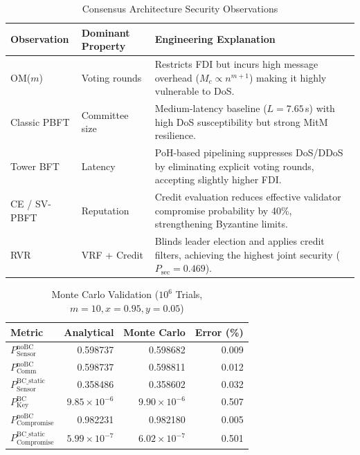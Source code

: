\documentclass[10pt,twocolumn,journal]{IEEEtran}
\begin{document}
\begin{table}[t]
\caption{Consensus Architecture Security Observations}
\label{tab:engineering_insights}
\centering
\scriptsize
\begin{tabular}{@{}llp{4.5cm}@{}}
\toprule
\textbf{Observation} & \textbf{Dominant Property} & \textbf{Engineering Explanation} \\
\midrule
OM($m$) & Voting rounds & Restricts FDI but incurs high message overhead ($M_c \propto n^{m+1}$) making it highly vulnerable to DoS. \\
Classic PBFT & Committee size & Medium-latency baseline ($L=7.65$\,s) with high DoS susceptibility but strong MitM resilience. \\
Tower BFT & Latency & PoH-based pipelining suppresses DoS/DDoS by eliminating explicit voting rounds, accepting slightly higher FDI. \\
CE / SV-PBFT & Reputation & Credit evaluation reduces effective validator compromise probability by 40\%, strengthening Byzantine limits. \\
RVR & VRF + Credit & Blinds leader election and applies credit filters, achieving the highest joint security ($P_{\mathrm{sec}} = 0.469$). \\
\bottomrule
\end{tabular}
\end{table}

\begin{table}[t]
\caption{Monte Carlo Validation ($10^6$ Trials, $m=10, x=0.95, y=0.05$)}
\label{tab:mc_validation}
\centering
\scriptsize
\begin{tabular}{@{}lrrr@{}}
\toprule
\textbf{Metric} & \textbf{Analytical} & \textbf{Monte Carlo} & \textbf{Error (\%)} \\
\midrule
$P_{\mathrm{Sensor}}^{\mathrm{noBC}}$ & 0.598737 & 0.598682 & 0.009 \\
$P_{\mathrm{Comm}}^{\mathrm{noBC}}$ & 0.598737 & 0.598811 & 0.012 \\
$P_{\mathrm{Sensor}}^{\mathrm{BC\_static}}$ & 0.358486 & 0.358602 & 0.032 \\
$P_{\mathrm{Key}}^{\mathrm{BC}}$ & $9.85 \times 10^{-6}$ & $9.90 \times 10^{-6}$ & 0.507 \\
$P_{\mathrm{Compromise}}^{\mathrm{noBC}}$ & 0.982231 & 0.982180 & 0.005 \\
$P_{\mathrm{Compromise}}^{\mathrm{BC\_static}}$ & $5.99 \times 10^{-7}$ & $6.02 \times 10^{-7}$ & 0.501 \\
\bottomrule
\end{tabular}
\end{table}
\end{document}
